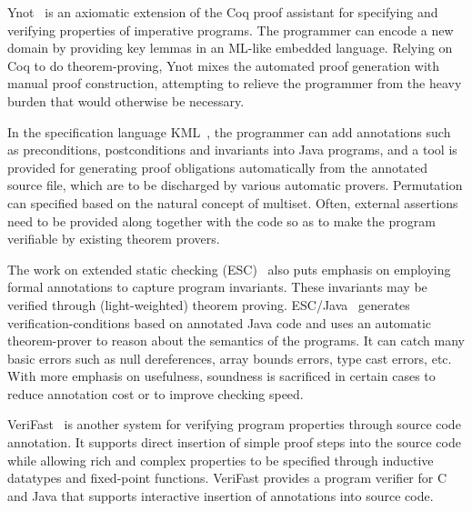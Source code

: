 \documentclass{llncs}
\begin{document}
Ynot~\cite{Ynot-EIP} is an axiomatic extension of the Coq
proof assistant for specifying and verifying properties of imperative
programs. The programmer can encode a new domain by providing key lemmas in
an ML-like embedded language.  Relying on Coq to do theorem-proving, Ynot
mixes the automated proof generation with manual proof construction,
attempting to relieve the programmer from the heavy burden that would
otherwise be necessary.

In the specification language KML~\cite{Tushkanova2009Specifying}, the
programmer can add annotations such as preconditions, postconditions and
invariants into Java programs, and a tool is provided for generating proof
obligations automatically from the annotated source file, which are to be
discharged by various automatic provers. Permutation can specified based on
the natural concept of multiset. Often, external assertions need to be
provided along together with the code so as to make the program verifiable
by existing theorem provers.

The work on extended static checking (ESC)~\cite{ESC} also puts emphasis on
employing formal annotations to capture program invariants. These
invariants may be verified through (light-weighted) theorem
proving. ESC/Java~\cite{Fla02} generates verification-conditions based on
annotated Java code and uses an automatic theorem-prover to reason about
the semantics of the programs. It can catch many basic errors such as null
dereferences, array bounds errors, type cast errors, etc.  With more
emphasis on usefulness, soundness is sacrificed in certain cases to reduce
annotation cost or to improve checking speed.

VeriFast~\cite{VeriFast} is another system for verifying program properties
through source code annotation. It supports direct insertion of simple
proof steps into the source code while allowing rich and complex properties
to be specified through inductive datatypes and fixed-point functions.
VeriFast provides a program verifier for C and Java that supports
interactive insertion of annotations into source code.
\end{document}

